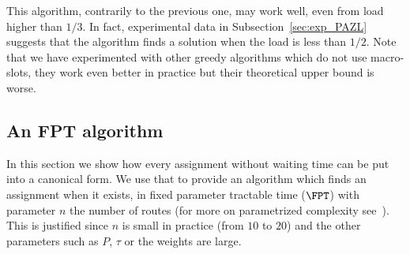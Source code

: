 \documentclass[10pt, conference, letterpaper]{IEEEtran}
\begin{document}
% 
% 
% 
	
This algorithm, contrarily to the previous one, may work well, even from load higher than $1/3$.
In fact, experimental data in Subsection~\ref{sec:exp_PAZL} suggests that the algorithm finds a solution when the load is less than $1/2$. Note that we have experimented with other greedy algorithms which do not use macro-slots, they work even better in practice but their theoretical upper bound is worse.

\subsection{An FPT algorithm}

In this section we show how every assignment without waiting time can be put into a canonical form.
We use that to provide an algorithm which finds an assignment when it exists, in fixed parameter tractable time ($\FPT$) with parameter $n$ the number of routes (for more on parametrized complexity see~\cite{downey2012parameterized}). This is justified since $n$ is small in practice (from $10$ to $20$) and the other parameters such as $P$, $\tau$ or the weights are large.
\end{document}
